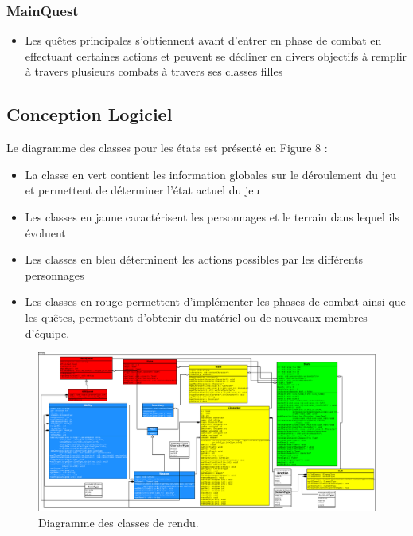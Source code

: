 \documentclass[a4paper,12pt]{article}
\begin{document}
\subsubsection{MainQuest}
\begin{itemize}
\item Les quêtes principales s'obtiennent avant d'entrer en phase de combat en effectuant certaines actions et peuvent se décliner en divers objectifs à remplir à travers plusieurs combats à travers ses classes filles
\end{itemize}


\subsection{Conception Logiciel}
Le diagramme des classes pour les états est présenté en Figure 8 : 
\begin{itemize}
\item La classe en vert contient les information globales sur le déroulement du jeu et permettent de déterminer l'état actuel du jeu
\item Les classes en jaune caractérisent les personnages et le terrain dans lequel ils évoluent
\item Les classes en bleu déterminent les actions possibles par les différents personnages
\item Les classes en rouge permettent d'implémenter les phases de combat ainsi que les quêtes, permettant d'obtenir du matériel ou de nouveaux membres d'équipe.
\end{itemize}

\begin{landscape}
    \begin{figure}[p]
    \includegraphics[width=0.9\paperheight]{state.png}
        \caption{\label{uml:render}Diagramme des classes de rendu.} 
    \end{figure}
\end{landscape}
\end{document}
